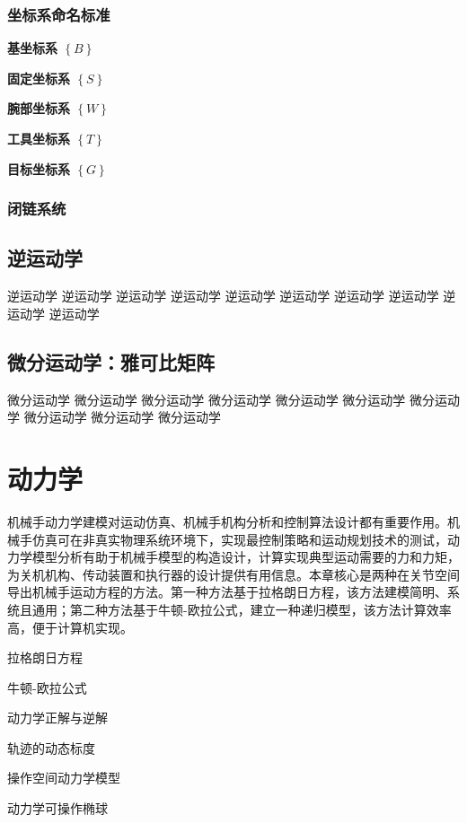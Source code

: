 \documentclass[cn,11pt,chinese,blue,bibstyle=ieeetr]{elegantbook}
\begin{document}
\subsection{坐标系命名标准}

\textbf{基坐标系 $\left\{B\right\}$}


\textbf{固定坐标系 $\left\{S\right\}$}


\textbf{腕部坐标系 $\left\{W\right\}$}


\textbf{工具坐标系 $\left\{T\right\}$}


\textbf{目标坐标系 $\left\{G\right\}$}



\subsection{闭链系统}


\section{逆运动学}\label{inverse_kinematics}

逆运动学
逆运动学
逆运动学
逆运动学
逆运动学
逆运动学
逆运动学
逆运动学
逆运动学
逆运动学


\section{微分运动学：雅可比矩阵}\label{differential_kinematics_jacobi_matrix}

微分运动学
微分运动学
微分运动学
微分运动学
微分运动学
微分运动学
微分运动学
微分运动学
微分运动学
微分运动学





\chapter{动力学}
机械手动力学建模对运动仿真、机械手机构分析和控制算法设计都有重要作用。机械手仿真可在非真实物理系统环境下，实现最控制策略和运动规划技术的测试，动力学模型分析有助于机械手模型的构造设计，计算实现典型运动需要的力和力矩，为关机机构、传动装置和执行器的设计提供有用信息。本章核心是两种在关节空间导出机械手运动方程的方法。第一种方法基于拉格朗日方程，该方法建模简明、系统且通用；第二种方法基于牛顿-欧拉公式，建立一种递归模型，该方法计算效率高，便于计算机实现。

\begin{introduction}
	\item 拉格朗日方程
	\item 牛顿-欧拉公式
	\item 动力学正解与逆解
	\item 轨迹的动态标度
	\item 操作空间动力学模型
	\item 动力学可操作椭球
\end{introduction}
\end{document}
